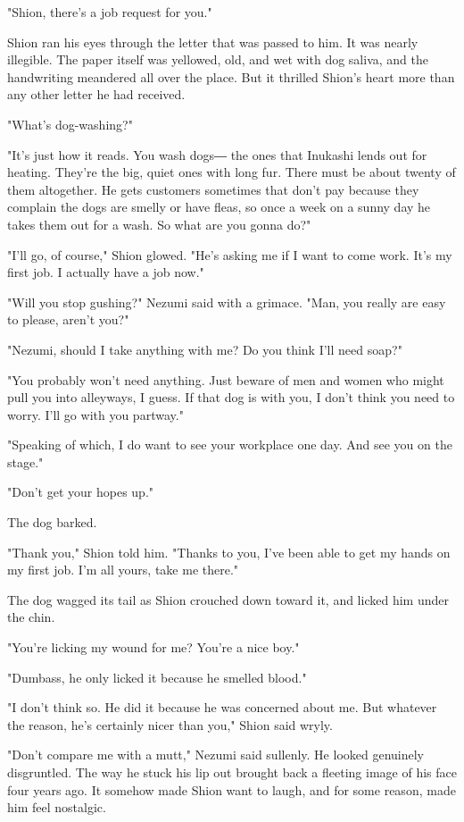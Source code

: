 "Shion, there's a job request for you."

Shion ran his eyes through the letter that was passed to him. It was
nearly illegible. The paper itself was yellowed, old, and wet with dog
saliva, and the handwriting meandered all over the place. But it
thrilled Shion's heart more than any other letter he had received.


"What's dog-washing?"

"It's just how it reads. You wash dogs― the ones that Inukashi lends out
for heating. They're the big, quiet ones with long fur. There must be
about twenty of them altogether. He gets customers sometimes that don't
pay because they complain the dogs are smelly or have fleas, so once a
week on a sunny day he takes them out for a wash. So what are you gonna
do?"

"I'll go, of course," Shion glowed. "He's asking me if I want to come
work. It's my first job. I actually have a job now."

"Will you stop gushing?" Nezumi said with a grimace. "Man, you really
are easy to please, aren't you?"

"Nezumi, should I take anything with me? Do you think I'll need soap?"

"You probably won't need anything. Just beware of men and women who
might pull you into alleyways, I guess. If that dog is with you, I don't
think you need to worry. I'll go with you partway."

"Speaking of which, I do want to see your workplace one day. And see you
on the stage."

"Don't get your hopes up."

The dog barked.

"Thank you," Shion told him. "Thanks to you, I've been able to get my
hands on my first job. I'm all yours, take me there."

The dog wagged its tail as Shion crouched down toward it, and licked him
under the chin.

"You're licking my wound for me? You're a nice boy."

"Dumbass, he only licked it because he smelled blood."

"I don't think so. He did it because he was concerned about me. But
whatever the reason, he's certainly nicer than you," Shion said wryly.

"Don't compare me with a mutt," Nezumi said sullenly. He looked
genuinely disgruntled. The way he stuck his lip out brought back a
fleeting image of his face four years ago. It somehow made Shion want to
laugh, and for some reason, made him feel nostalgic.

